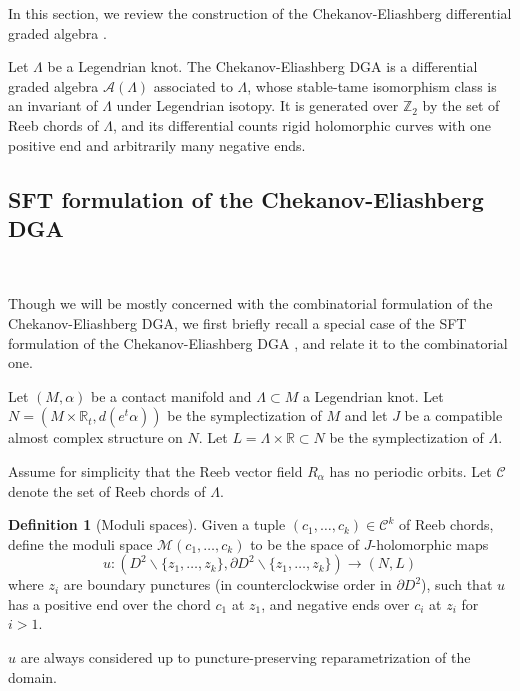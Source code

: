 \documentclass[a4paper,final, reqno]{amsart}
\theoremstyle{plain}
\theoremstyle{definition}
\newtheorem{Def}[Th]{Definition}
\renewcommand{\setminus}{\smallsetminus}
\newcommand{\A}{\mathcal{A}}
\newcommand{\C}{\mathcal{C}}
\newcommand{\M}{\mathcal{M}}
\begin{document}
	In this section, we review the construction of the Chekanov-Eliashberg differential graded algebra \cite{Chekanov}.
	
	
	Let $\Lambda$ be a Legendrian knot. The Chekanov-Eliashberg DGA is a differential graded algebra $\A(\Lambda)$ associated to $\Lambda$, whose stable-tame isomorphism class is an invariant of $\Lambda$ under Legendrian isotopy. It is generated over $\mathbb{Z}_2$ by the set of Reeb chords of $\Lambda$, and its  differential counts rigid holomorphic curves with one positive end and arbitrarily many negative ends. 
	
	
	
	
	
	\subsection{SFT formulation of the Chekanov-Eliashberg DGA}
	
	\-\
	
	Though we will be mostly concerned with the combinatorial formulation of the Chekanov-Eliashberg DGA, we first briefly recall a special case of the SFT formulation of the Chekanov-Eliashberg DGA \cite{egh}, and relate it to the combinatorial one.
	
	Let $(M, \alpha)$ be a contact manifold and $\Lambda \subset M$ a Legendrian knot. Let $N = (M\times \mathbb{R}_t, d(e^t \alpha))$ be the symplectization of $M$ and let $J$ be a compatible almost complex structure on $N$. Let $L = \Lambda \times \mathbb{R} \subset N$ be the symplectization of $\Lambda$. 
	
	Assume for simplicity that the Reeb vector field $R_{\alpha}$ has no periodic orbits. Let $\C$ denote the set of Reeb chords of $\Lambda$.
	
	
	
	\begin{Def}[Moduli spaces]
		Given a tuple $(c_1,\dots, c_k) \in \C^k$ of Reeb chords, define the moduli space $\M(c_1,\dots, c_k)$ to be the space of $J$-holomorphic maps 
		\[ u: \left(D^2\setminus \{z_1,\dots, z_k\}, \partial D^2 \setminus \{z_1, \dots, z_k\}\right) \to (N, L) \]	
		where $z_i$ are boundary punctures (in counterclockwise order in $\partial D^2$), such that $u$ has a positive end over the chord $c_1$ at $z_1$, and negative ends over $c_i$ at $z_i$ for $i>1$. 
		
		$u$ are always considered up to puncture-preserving reparametrization of the domain.
	\end{Def}
	
\end{document}
